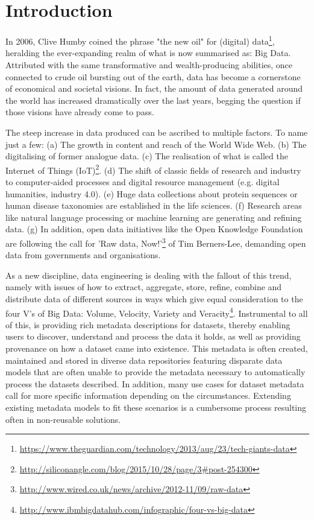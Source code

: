 \documentclass[runningheads,a4paper]{llncs}
\newcommand\footnoteurl[1]{\footnote{\scriptsize\url{#1}}}
\begin{document}
\section{Introduction}
\label{introduction}

In 2006, Clive Humby coined the phrase "the new oil" for (digital) data\footnoteurl{https://www.theguardian.com/technology/2013/aug/23/tech-giants-data}, heralding the ever-expanding realm of what is now summarised as: Big Data. Attributed with the same transformative and wealth-producing abilities, once connected to crude oil bursting out of the earth, data has become a cornerstone of economical and societal visions. In fact, the amount of data generated around the world has increased dramatically over the last years, begging the question if those visions have already come to pass.

The steep increase in data produced can be ascribed to multiple factors. To name just a few:
(a) The growth in content and reach of the World Wide Web.
(b) The digitalising of former analogue data.
(c) The realisation of what is called the Internet of Things (IoT)\footnoteurl{http://siliconangle.com/blog/2015/10/28/page/3\#post-254300}.
(d) The shift of classic fields of research and industry to computer-aided processes and digital resource management (e.g. digital humanities, industry 4.0).
(e) Huge data collections about protein sequences or human disease taxonomies are established in the life sciences.
(f) Research areas like natural language processing or machine learning are generating and refining data.
(g) In addition, open data initiatives like the Open Knowledge Foundation are following the call for 'Raw data, Now!'\footnoteurl{http://www.wired.co.uk/news/archive/2012-11/09/raw-data} of Tim Berners-Lee, demanding open data from governments and organisations. %

As a new discipline, data engineering is dealing with the fallout of this trend, namely with issues of how to extract, aggregate, store, refine, combine and distribute data of different sources in ways which give equal consideration to the four V's of Big Data: Volume, Velocity, Variety and Veracity\footnoteurl{http://www.ibmbigdatahub.com/infographic/four-vs-big-data}. Instrumental to all of this, is providing rich metadata descriptions for datasets, thereby enabling users to discover, understand and process the data it holds, as well as providing provenance on how a dataset came into existence.
This metadata is often created, maintained and stored in diverse data repositories featuring disparate data models that are often unable to provide the metadata necessary to automatically process the datasets described. In addition, many use cases for dataset metadata call for more specific information depending on the circumstances. Extending existing metadata models to fit these scenarios is a cumbersome process resulting often in non-reusable solutions.
\end{document}
